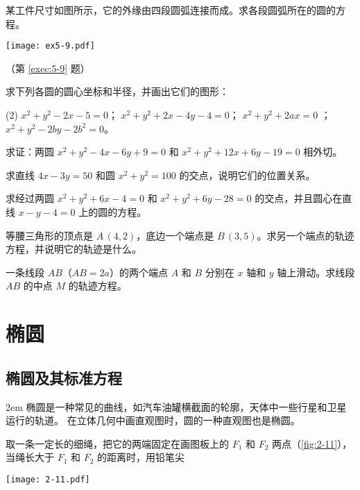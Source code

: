 \begin{Exercise}
\begin{question}
\begin{tasks}
    \end{tasks}
    \item \label{exec:5-9}某工件尺寸如图所示，它的外缘由四段圆弧连接而成。求各段圆弧所在的圆的方程。
    \begin{figurehere}
      \begin{minipage}{\linewidth}\centering
        \texttt{[image: ex5-9.pdf]}
        \caption*{（第 \ref{exec:5-9} 题）}
      \end{minipage}
    \end{figurehere}
    \item 求下列各圆的圆心坐标和半径，并画出它们的图形：
    \begin{tasks}(2)
      \task $x^2+y^2-2x-5=0$；
      \task $x^2+y^2+2x-4y-4=0$；
      \task $x^2+y^2+2ax=0$ ；
      \task $x^2+y^2-2by-2b^2=0$。
    \end{tasks}
    \item 求证：两圆 $x^2+y^2-4x-6y+9=0$ 和 $x^2+y^2+12x+6y-19=0$ 相外切。
    \item 求直线 $4x-3y=50$ 和圆 $x^2+y^2=100$ 的交点，说明它们的位置关系。
    \item 求经过两圆 $x^2+y^2+6x-4=0$ 和 $x^2+y^2+6y-28=0$ 的交点，并且圆心在直线 $x-y-4=0$ 上的圆的方程。
    \item 等腰三角形的顶点是 $A\,(4,2)$，底边一个端点是 $B\,(3,5)$。求另一个端点的轨迹方程，并说明它的轨迹是什么。
    \item 一条线段 $AB$（$AB=2a$）的两个端点 $A$ 和 $B$ 分别在 $x$ 轴和 $y$ 轴上滑动。求线段 $AB$ 的中点 $M$ 的轨迹方程。
  \end{question}
\end{Exercise}

\section{椭圆}
\subsection{椭圆及其标准方程}
\medskip\noindent
\begin{minipage}{0.5\linewidth}\parindent2em
椭圆是一种常见的曲线，如汽车油罐横截面的轮廓，天体中一些行星和卫星运行的轨道。
在立体几何中画直观图时，圆的一种直观图也是椭圆。

取一条一定长的细绳，把它的两端固定在画图板上的 $F_1$ 和 $F_2$ 两点（\cref{fig:2-11}），当绳长大于 $F_1$ 和 $F_2$ 的距离时，用铅笔尖
\end{minipage}\hfill
\begin{minipage}{0.45\linewidth}\centering
\begin{figurehere}
  \texttt{[image: 2-11.pdf]}
  \caption{}\label{fig:2-11}
\end{figurehere}
\end{minipage}

